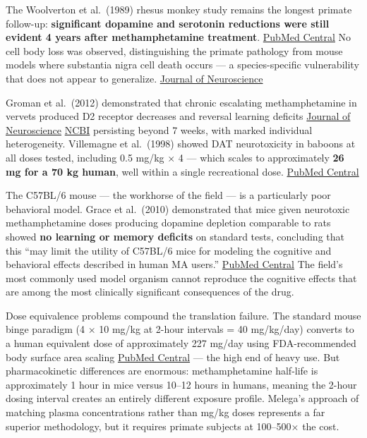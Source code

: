 The Woolverton et al.~(1989) rhesus monkey study remains the longest primate follow-up: \textbf{significant dopamine and serotonin reductions were still evident 4 years after methamphetamine treatment}. \href{https://pmc.ncbi.nlm.nih.gov/articles/PMC8338805/}{PubMed Central} No cell body loss was observed, distinguishing the primate pathology from mouse models where substantia nigra cell death occurs --- a species-specific vulnerability that does not appear to generalize. \href{https://www.jneurosci.org/content/18/20/8417}{Journal of Neuroscience}

Groman et al.~(2012) demonstrated that chronic escalating methamphetamine in vervets produced D2 receptor decreases and reversal learning deficits \href{https://www.jneurosci.org/content/32/17/5843}{Journal of Neuroscience} \href{https://www.ncbi.nlm.nih.gov/pmc/articles/PMC3353813/}{NCBI} persisting beyond 7 weeks, with marked individual heterogeneity. Villemagne et al.~(1998) showed DAT neurotoxicity in baboons at all doses tested, including 0.5 mg/kg × 4 --- which scales to approximately \textbf{26 mg for a 70 kg human}, well within a single recreational dose. \href{https://pmc.ncbi.nlm.nih.gov/articles/PMC6793413/}{PubMed Central}

The C57BL/6 mouse --- the workhorse of the field --- is a particularly poor behavioral model. Grace et al.~(2010) demonstrated that mice given neurotoxic methamphetamine doses producing dopamine depletion comparable to rats showed \textbf{no learning or memory deficits} on standard tests, concluding that this ``may limit the utility of C57BL/6 mice for modeling the cognitive and behavioral effects described in human MA users.'' \href{https://pmc.ncbi.nlm.nih.gov/articles/PMC2854319/}{PubMed Central} The field's most commonly used model organism cannot reproduce the cognitive effects that are among the most clinically significant consequences of the drug.

Dose equivalence problems compound the translation failure. The standard mouse binge paradigm (4 × 10 mg/kg at 2-hour intervals = 40 mg/kg/day) converts to a human equivalent dose of approximately 227 mg/day using FDA-recommended body surface area scaling \href{https://pmc.ncbi.nlm.nih.gov/articles/PMC4804402/}{PubMed Central} --- the high end of heavy use. But pharmacokinetic differences are enormous: methamphetamine half-life is approximately 1 hour in mice versus 10--12 hours in humans, meaning the 2-hour dosing interval creates an entirely different exposure profile. Melega's approach of matching plasma concentrations rather than mg/kg doses represents a far superior methodology, but it requires primate subjects at 100--500× the cost.


